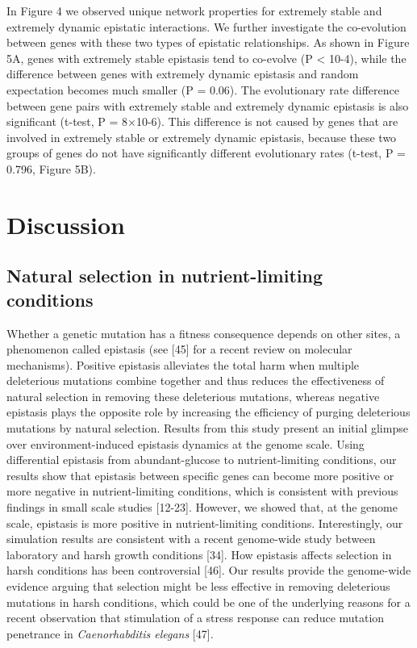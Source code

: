 In Figure 4 we observed unique network properties for extremely stable
and extremely dynamic epistatic interactions. We further investigate
the co-evolution between genes with these two types of epistatic
relationships. As shown in Figure 5A, genes with extremely stable
epistasis tend to co-evolve (P < 10-4), while the difference between
genes with extremely dynamic epistasis and random expectation becomes
much smaller (P = 0.06). The evolutionary rate difference between gene
pairs with extremely stable and extremely dynamic epistasis is also
significant (t-test, P = 8×10-6). This difference is not caused by
genes that are involved in extremely stable or extremely dynamic
epistasis, because these two groups of genes do not have significantly
different evolutionary rates (t-test, P = 0.796, Figure 5B).

\section{Discussion}

\subsection{Natural selection in nutrient-limiting conditions}

Whether a genetic mutation has a fitness consequence depends on other
sites, a phenomenon called epistasis (see [45] for a recent review on
molecular mechanisms). Positive epistasis alleviates the total harm
when multiple deleterious mutations combine together and thus reduces
the effectiveness of natural selection in removing these deleterious
mutations, whereas negative epistasis plays the opposite role by
increasing the efficiency of purging deleterious mutations by natural
selection. Results from this study present an initial glimpse over
environment-induced epistasis dynamics at the genome scale. Using
differential epistasis from abundant-glucose to nutrient-limiting
conditions, our results show that epistasis between specific genes can
become more positive or more negative in nutrient-limiting conditions,
which is consistent with previous findings in small scale studies
[12-23]. However, we showed that, at the genome scale, epistasis is
more positive in nutrient-limiting conditions. Interestingly, our
simulation results are consistent with a recent genome-wide study
between laboratory and harsh growth conditions [34]. How epistasis
affects selection in harsh conditions has been controversial [46]. Our
results provide the genome-wide evidence arguing that selection might
be less effective in removing deleterious mutations in harsh
conditions, which could be one of the underlying reasons for a recent
observation that stimulation of a stress response can reduce mutation
penetrance in \textit{Caenorhabditis elegans} [47].


